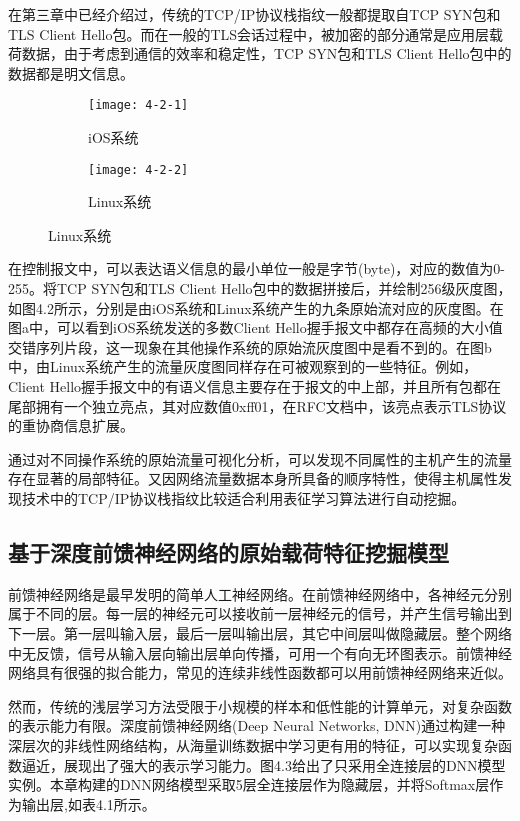 在第三章中已经介绍过，传统的TCP/IP协议栈指纹一般都提取自TCP SYN包和TLS Client Hello包。而在一般的TLS会话过程中，被加密的部分通常是应用层载荷数据，由于考虑到通信的效率和稳定性，TCP SYN包和TLS Client Hello包中的数据都是明文信息。

\begin{figure}[!htbp]
    \centering
    \begin{subfigure}[b]{0.3\textwidth}
      \texttt{[image: 4-2-1]}
      \caption{iOS系统}
    \end{subfigure}%
    \hspace{20pt}
    \begin{subfigure}[b]{0.3\textwidth}
      \texttt{[image: 4-2-2]}
      \caption{Linux系统}
    \end{subfigure}
    \label{fig:3-6}
\end{figure}

在控制报文中，可以表达语义信息的最小单位一般是字节(byte)，对应的数值为0-255。将TCP SYN包和TLS Client Hello包中的数据拼接后，并绘制256级灰度图，如图4.2所示，分别是由iOS系统和Linux系统产生的九条原始流对应的灰度图。在图a中，可以看到iOS系统发送的多数Client Hello握手报文中都存在高频的大小值交错序列片段，这一现象在其他操作系统的原始流灰度图中是看不到的。在图b中，由Linux系统产生的流量灰度图同样存在可被观察到的一些特征。例如，Client Hello握手报文中的有语义信息主要存在于报文的中上部，并且所有包都在尾部拥有一个独立亮点，其对应数值0xff01，在RFC文档中，该亮点表示TLS协议的重协商信息扩展。

通过对不同操作系统的原始流量可视化分析，可以发现不同属性的主机产生的流量存在显著的局部特征。又因网络流量数据本身所具备的顺序特性，使得主机属性发现技术中的TCP/IP协议栈指纹比较适合利用表征学习算法进行自动挖掘。

\subsection{基于深度前馈神经网络的原始载荷特征挖掘模型}

前馈神经网络是最早发明的简单人工神经网络。在前馈神经网络中，各神经元分别属于不同的层。每一层的神经元可以接收前一层神经元的信号，并产生信号输出到下一层。第一层叫输入层，最后一层叫输出层，其它中间层叫做隐藏层。整个网络中无反馈，信号从输入层向输出层单向传播，可用一个有向无环图表示。前馈神经网络具有很强的拟合能力，常见的连续非线性函数都可以用前馈神经网络来近似。

然而，传统的浅层学习方法受限于小规模的样本和低性能的计算单元，对复杂函数的表示能力有限。深度前馈神经网络(Deep Neural Networks, DNN)通过构建一种深层次的非线性网络结构，从海量训练数据中学习更有用的特征，可以实现复杂函数逼近，展现出了强大的表示学习能力。图4.3给出了只采用全连接层的DNN模型实例。本章构建的DNN网络模型采取5层全连接层作为隐藏层，并将Softmax层作为输出层,如表4.1所示。

